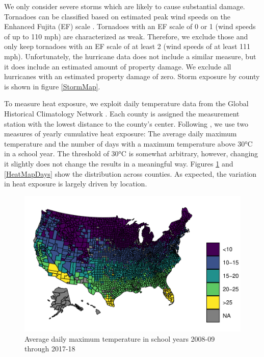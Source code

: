 We only consider severe storms which are likely to cause substantial damage. Tornadoes can be classified based on estimated peak wind speeds on the Enhanced Fujita (EF) scale \citep[for more details see][]{EF_Scale}. Tornadoes with an EF scale of 0 or 1 (wind speeds of up to 110 mph) are characterized as weak. Therefore, we exclude those and only keep tornadoes with an EF scale of at least 2 (wind speeds of at least 111 mph). Unfortunately, the hurricane data does not include a similar measure, but it does include an estimated amount of property damage. We exclude all hurricanes with an estimated property damage of zero.  Storm exposure by county is shown in figure \ref{StormMap}.

To measure heat exposure, we exploit daily temperature data from the Global Historical Climatology Network \citep{Menne_2012}. Each county is assigned the measurement station with the lowest distance to the county's center. Following \cite{Goodman_2020}, we use two measures of yearly cumulative heat exposure: The average daily maximum temperature and the number of days with a maximum temperature above 30°C in a school year. The threshold of 30°C is somewhat arbitrary, however, changing it slightly does not change the results in a meaningful way. Figures \ref{HeatMapTemp} and \ref{HeatMapDays} show the distribution across counties. As expected, the variation in heat exposure is largely driven by location.

\begin{figure}[!h]
	\centering
	\includegraphics[scale=1]{"../Code & Data/HeatMapTemp.pdf"}
	\caption{Average daily maximum temperature in school years 2008-09 through 2017-18}
	\label{HeatMapTemp}
\end{figure}

